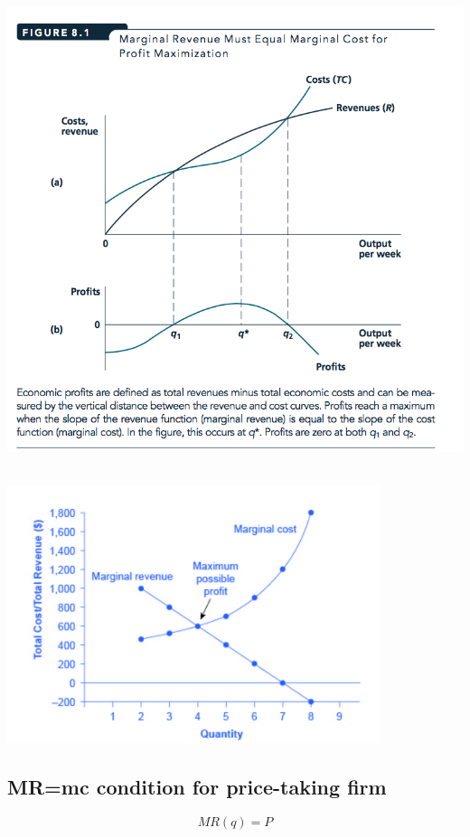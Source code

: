 \documentclass[]{article}
\begin{document}
\includegraphics[height=5.5in]{picsfigs/fig8-1.png}

\includegraphics[width=4.3in]{picsfigs/monopmcmr.png}

\hypertarget{mrmc-condition-for-price-taking-firm}{%
\subsection{MR=mc condition for price-taking
firm}\label{mrmc-condition-for-price-taking-firm}}

\[MR(q) = P\]
\end{document}
